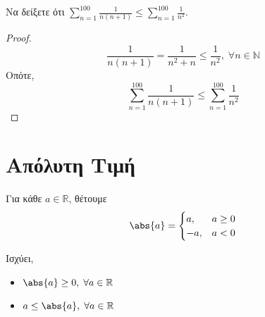 \documentclass[main.tex]{subfiles}
\begin{document}
\begin{example}
    Να δείξετε ότι $ \sum_{n=1}^{100} \frac{1}{n(n+1)} \leq \sum_{n=1}^{100}
    \frac{1}{n^{2}} $.
\end{example}

\begin{proof}
    \[
        \frac{1}{n(n+1)} = \frac{1}{n^{2}+n} \leq \frac{1}{n^{2}} ,\; 
        \forall n \in \mathbb{N} 
     \] 
     Οπότε,
     \[
         \sum_{n=1}^{100} \frac{1}{n(n+1)} \leq \sum_{n=1}^{100} 
     \frac{1}{n^{2}}
      \]
\end{proof}

\section{Απόλυτη Τιμή}

\begin{dfn}
    Για κάθε $ a \in \mathbb{R} $, θέτουμε
   \[
       \abs{a} = \begin{cases} a, & a \geq 0 \\
       -a, & a < 0\end{cases}  
    \] 
\end{dfn}

\begin{rem}
    Ισχύει, 
    \begin{itemize}
\item  $ \abs{a} \geq 0, \;  \forall a \in \mathbb{R} $
\item $ a \leq \abs{a}, \; \forall a \in \mathbb{R} $
    \end{itemize}
\end{rem}
\end{document}
